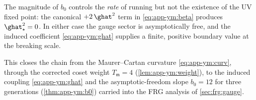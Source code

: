 \begin{remark}
\label{rem:app-ym:freedom}
The magnitude of $b_{0}$ controls the \emph{rate} of running but not the
existence of the UV fixed point: the canonical $+2\,\ghat^{2}$ term in
\eqref{eq:app-ym:beta} produces $\ghat^{2}_{\star}=0$. In either case the
gauge sector is asymptotically free, and the induced coefficient
\eqref{eq:app-ym:ghat} supplies a finite, positive boundary value at the
breaking scale.
\end{remark}

This closes the chain from the Maurer--Cartan curvature
\eqref{eq:app-ym:curv}, through the corrected coset weight
$T_{\mathfrak m}=4$ (\autoref{lem:app-ym:weight}), to the induced
coupling \eqref{eq:app-ym:ghat} and the asymptotic-freedom slope
$b_{0}=12$ for three generations (\autoref{thm:app-ym:b0}) carried into
the FRG analysis of \autoref{sec:frg:gauge}.
